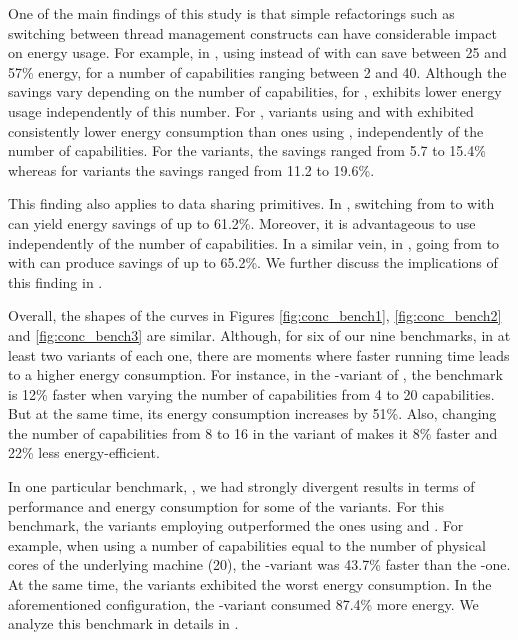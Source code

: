  One of the main findings of this study is that simple refactorings such as switching between thread management constructs can have considerable impact on energy usage. For example, in \spectral, using \forkOn instead of \forkOS with \TVar can save between 25 and 57\% energy, for a number of capabilities ranging between 2 and 40. Although the savings vary depending on the number of capabilities, for \spectral, \forkOn exhibits lower energy usage independently of this number. For \mandelbrot, variants using \forkOS and \forkOn with \MVar exhibited consistently lower energy consumption than ones using \forkIO, independently of the number of capabilities. For the \forkOS variants, the savings ranged from 5.7 to 15.4\% whereas for \forkOn variants the savings ranged from 11.2 to 19.6\%.

This finding also applies to data sharing primitives. In \chameneos, switching from \TMVar to \MVar with \forkOn can yield energy savings of up to 61.2\%. Moreover, it is advantageous to use \MVar independently of the number of capabilities. In a similar vein, in \fasta, going from \TVar to \MVar with \forkIO can produce savings of up to 65.2\%. We further discuss the implications of this finding in .
\newline

 Overall, the shapes of the curves in Figures \ref{fig:conc_bench1}, \ref{fig:conc_bench2} and \ref{fig:conc_bench3} are similar. Although, for six of our nine benchmarks, in at least two variants of each one, there are moments where faster running time leads to a higher energy consumption. For instance, in the \forkOn-\TMVar variant of \regex, the benchmark is 12\% faster when varying the number of capabilities from 4 to 20 capabilities. But at the same time, its energy consumption increases by 51\%. Also, changing the number of capabilities from 8 to 16 in the \forkIO variant of \tsearch makes it 8\% faster and 22\% less energy-efficient.

In one particular benchmark, \fasta, we had strongly divergent results in terms of performance and energy consumption for some of the variants. For this benchmark, the variants  employing \TVar outperformed the ones using \TMVar and \MVar. For example, when using a number of capabilities equal to the number of physical cores of the underlying machine (20), the \forkOS-\TVar variant was 43.7\% faster than the \forkOS-\MVar one. At the same time, the \TVar variants exhibited the worst energy consumption. In the aforementioned configuration, the \forkOS-\TVar variant consumed 87.4\% more energy. We analyze this benchmark in details in .
\newline

